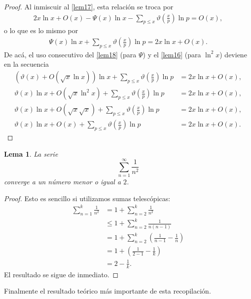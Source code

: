 \documentclass[10pt]{article}
\newtheorem{lemma}[theorem]{Lema}
\theoremstyle{definition}
\theoremstyle{remark}
\begin{document}
\begin{proof}
Al inmiscuir al \cref{lem17}, esta relaci\'on se troca por 
\begin{align}
2x\ln x + O(x) - \Psi(x)\ln x - \sum_{p \leq x} \vartheta\left(\frac{x}{p}\right)\ln p = O(x), 
\end{align}
o lo que es lo mismo por 
\begin{align}
\Psi(x)\ln x + \sum_{p \leq x} \vartheta\left(\frac{x}{p}\right)\ln p = 2x\ln x + O(x).
\end{align}
De ac\'a, el uso consecutivo del \cref{lem18} (para $\Psi$) y el \cref{lem16} (para $\ln^2 x$) deviene en la secuencia
\begin{align}
(\vartheta(x) + O(\sqrt{x}\ln x))\ln x + \sum_{p \leq x} \vartheta\left(\frac{x}{p}\right)\ln p &= 2x\ln x + O(x), \\
\vartheta(x)\ln x + O(\sqrt{x}\ln^2 x) + \sum_{p \leq x} \vartheta\left(\frac{x}{p}\right)\ln p &= 2x\ln x + O(x), \\
\vartheta(x)\ln x + O(\sqrt{x}\sqrt{x}) + \sum_{p \leq x} \vartheta\left(\frac{x}{p}\right)\ln p &= 2x\ln x + O(x), \\
\vartheta(x)\ln x + O(x) + \sum_{p \leq x} \vartheta\left(\frac{x}{p}\right)\ln p &= 2x\ln x + O(x).
\end{align}
\end{proof}

\begin{lemma}
La serie
\[
\sum_{n = 1}^\infty \frac{1}{n ^ 2}
\]
converge a un n\'umero menor o igual a $2$. 
\end{lemma}

\begin{proof}
Esto es sencillo si utilizamos sumas telesc\'opicas: 
\begin{align}
\sum_{n = 1}^k \frac{1}{n^2} &= 1 + \sum_{n = 2}^k \frac{1}{n^2} \\
&\leq 1 + \sum_{n = 2}^k \frac{1}{n (n - 1)} \\
&= 1 + \sum_{n = 2}^k \left(\frac{1}{n - 1} - \frac{1}{n}\right) \\
&= 1 + \left(\frac{1}{2 - 1} - \frac{1}{k}\right) \\
&= 2 - \frac{1}{k}.
\end{align}
El resultado se sigue de inmediato. 
\end{proof}

Finalmente el resultado te\'orico m\'as importante de esta recopilaci\'on. 
\end{document}
